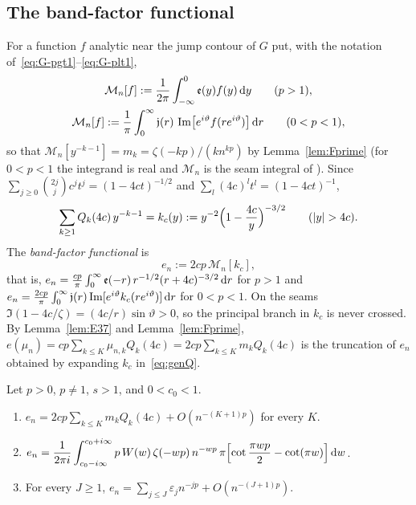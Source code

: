 \subsection{The band-factor functional}\label{sec:en}
For a function $f$ analytic near the jump contour of $G$ put, with the notation of~\eqref{eq:G-pgt1}--\eqref{eq:G-plt1},
\begin{gather*}
  \mathcal M_n[f]:=\frac1{2\pi}\int_{-\infty}^0\mathfrak e(y)f(y)\,\mathrm{d} y\qquad(p>1),\\
  \mathcal M_n[f]:=\frac1\pi\int_0^\infty\mathfrak j(r)\,\operatorname{Im}\bigl[e^{i\vartheta}f(re^{i\vartheta})\bigr]\,\mathrm{d} r\qquad(0<p<1),
\end{gather*}
so that $\mathcal M_n[y^{-k-1}]=m_k=\zeta(-kp)/(kn^{kp})$ by Lemma~\ref{lem:Fprime} (for $0<p<1$ the integrand is
real and $\mathcal M_n$ is the seam integral of \cite[Lemma~10.1(iii)]{PaperII}). Since
$\sum_{j\ge0}\binom{2j}jc^jt^j=(1-4ct)^{-1/2}$ and $\sum_l(4c)^lt^l=(1-4ct)^{-1}$,
\begin{equation}\label{eq:genQ}
  \sum_{k\ge1}Q_k(4c)\,y^{-k-1}=k_c(y):=y^{-2}\Bigl(1-\frac{4c}y\Bigr)^{-3/2}\qquad(|y|>4c).
\end{equation}
The \emph{band-factor functional} is
\begin{equation}\label{eq:en}
  e_n:=2cp\,\mathcal M_n[k_c],
\end{equation}
that is, $e_n=\frac{cp}\pi\int_0^\infty\mathfrak e(-r)\,r^{-1/2}(r+4c)^{-3/2}\,\mathrm{d} r$ for $p>1$ and
$e_n=\frac{2cp}\pi\int_0^\infty\mathfrak j(r)\operatorname{Im}[e^{i\vartheta}k_c(re^{i\vartheta})]\,\mathrm{d} r$ for $0<p<1$. On the seams
$\Im(1-4c/\zeta)=(4c/r)\sin\vartheta>0$, so the principal branch in $k_c$ is never crossed. By Lemma~\ref{lem:E37} and
Lemma~\ref{lem:Fprime}, $e(\mu_n)=cp\sum_{k\le K}\mu_{n,k}Q_k(4c)=2cp\sum_{k\le K}m_kQ_k(4c)$ is the truncation of $e_n$ obtained
by expanding $k_c$ in~\eqref{eq:genQ}.

\begin{theorem}\label{thm:K}
Let $p>0$, $p\ne1$, $s>1$, and $0<c_0<1$.
\begin{enumerate}
\item[(i)] $e_n=2cp\sum_{k\le K}m_kQ_k(4c)+O(n^{-(K+1)p})$ for every $K$.
\item[(ii)] $\displaystyle e_n=\frac1{2\pi i}\int_{c_0-i\infty}^{c_0+i\infty}p\,W(w)\,\zeta(-wp)\,n^{-wp}\,
  \pi\Bigl[\cot\frac{\pi wp}2-\cot(\pi w)\Bigr]\,\mathrm{d} w$.
\item[(iii)] For every $J\ge1$, $e_n=\sum_{j\le J}\varepsilon_jn^{-jp}+O(n^{-(J+1)p})$.
\end{enumerate}
\end{theorem}

